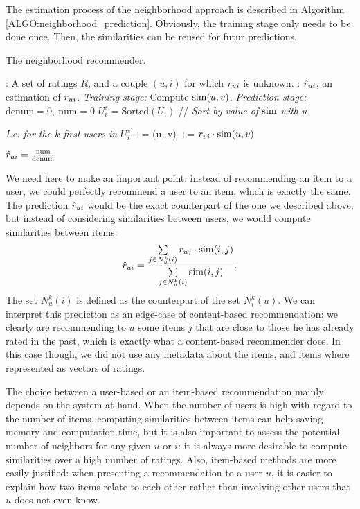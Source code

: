 The estimation process of the neighborhood approach is described in Algorithm
\ref{ALGO:neighborhood_prediction}.  Obviously, the training stage only needs
to be done once. Then, the
similarities can be reused for futur predictions.

\begin{algorithm}[!ht]
 \caption{The neighborhood recommender.}
       \label{ALGO:neighborhood_prediction}
       \begin{algorithmic}

         : A set of ratings $R$, and a couple $(u, i)$ for
         which $r_{ui}$ is  unknown.
         : $\hat{r}_{ui}$, an estimation of $r_{ui}$.
         \STATE \textit{Training stage:}
         \STATE Compute $\text{sim}(u, v)$.
	    \ENDFOR
       \STATE \textit{Prediction stage:}
         \STATE $\text{denum} = 0, ~ \text{num} = 0$
         \STATE $U_i^s = \text{Sorted}(U_i)$  // \textit{Sort by value of
         $\text{sim}$ with $u$}.

         \STATE \textit{I.e. for the  $k$ first users in $U_i^s$}
         \STATE {} += \ssim(u, v)
         \STATE {} += $r_{vi} \cdot \text{sim}(u, v)$
         \ENDFOR

         \STATE $\hat{r}_{ui} = \frac{\text{num}}{\text{denum}}$
\end{algorithmic}
\end{algorithm}

We need here to make an important point: instead of recommending an item to a
user, we could perfectly recommend a user to an item, which is exactly the
same. The prediction $\hat{r}_{ui}$ would be the exact counterpart of the one we
described above, but instead of considering similarities between users, we
would compute similarities between items:
$$\hat{r}_{ui} = \frac{\sum\limits_{j \in N_u^k(i)} r_{uj} \cdot \text{sim}(i, j)}
{\sum\limits_{j \in N_u^k(i)}\text{sim}(i, j)}.$$
The set $N_u^k(i)$ is defined as the counterpart of the set $N_i^k(u)$.
We can interpret this prediction as an edge-case of content-based
recommendation: we clearly are recommending to $u$ some items $j$ that are
close to those he has already rated in the past, which is exactly what a
content-based recommender does. In this case though, we did not use any
metadata about the items, and  items where represented as vectors of ratings.

The choice between a user-based or an item-based recommendation mainly depends on
the system at hand. When the number of users is high with regard to the number
of items, computing similarities between items can help saving memory and
computation time, but it is also important to assess the potential number of
neighbors for any given $u$ or $i$: it is always more desirable to compute
similarities over a high number of ratings. Also, item-based methods are
more easily justified: when presenting a recommendation to a user $u$, it is
easier to explain how two items relate to each other rather than involving
other users that $u$ does not even know.

